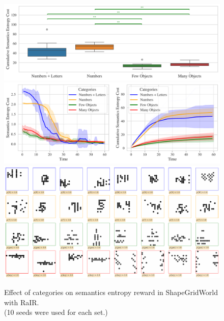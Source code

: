 \begin{figure}[H]
    \centering
    \includegraphics[width=\textwidth]{images/categories_boxplot_sgw_rair_cropped.pdf}\vspace{6pt}
    \includegraphics[width=\textwidth]{images/categories_comparison_sgw_rair.pdf}\vspace{6pt}
    \includegraphics[width=\textwidth]{images/categories_samples_sgw_rair.pdf}\vspace{3pt}
    \captionsetup{justification=centering}
    \caption[Effect of categories on semantics entropy reward in ShapeGridWorld.]{Effect of categories on semantics entropy reward in ShapeGridWorld with RaIR.\\(10 seeds were used for each set.)}
    \label{fig:categories-sgw}
\end{figure}

